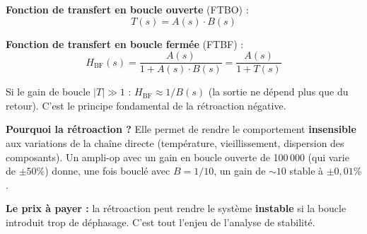 \documentclass[12pt,a4paper,twoside]{book}
\begin{document}
\begin{center}
\end{center}

\begin{formule}
\textbf{Fonction de transfert en boucle ouverte} (FTBO) :
\[
T(s) = A(s) \cdot B(s)
\]

\textbf{Fonction de transfert en boucle fermée} (FTBF) :
\[
\boxed{H_{\text{BF}}(s) = \frac{A(s)}{1 + A(s)\cdot B(s)} = \frac{A(s)}{1 + T(s)}}
\]

Si le gain de boucle $|T| \gg 1$ : $H_{\text{BF}} \approx 1/B(s)$ (la sortie ne dépend plus que du retour). C'est le principe fondamental de la rétroaction négative.
\end{formule}

\begin{intuition}
\textbf{Pourquoi la rétroaction ?} Elle permet de rendre le comportement \textbf{insensible} aux variations de la chaîne directe (température, vieillissement, dispersion des composants). Un ampli-op avec un gain en boucle ouverte de 100\,000 (qui varie de $\pm 50\%$) donne, une fois bouclé avec $B = 1/10$, un gain de $\sim 10$ stable à $\pm 0{,}01\%$.

\textbf{Le prix à payer :} la rétroaction peut rendre le système \textbf{instable} si la boucle introduit trop de déphasage. C'est tout l'enjeu de l'analyse de stabilité.
\end{intuition}
\end{document}
